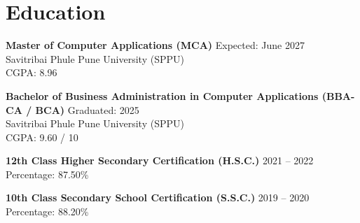 \documentclass[a4paper,10pt]{article}
\begin{document}
\section*{Education}

\textbf{Master of Computer Applications (MCA)} \hfill Expected: June 2027\\
Savitribai Phule Pune University (SPPU)\\
CGPA: 8.96 

\vspace{4pt} 

\textbf{Bachelor of Business Administration in Computer Applications (BBA-CA / BCA)} \hfill Graduated: 2025\\
Savitribai Phule Pune University (SPPU)\\
CGPA: 9.60 / 10

\vspace{4pt} 

\textbf{12th Class Higher Secondary Certification (H.S.C.)} \hfill 2021 -- 2022\\
Percentage: 87.50\%

\vspace{4pt} 

\textbf{10th Class Secondary School Certification (S.S.C.)} \hfill 2019 -- 2020\\
Percentage: 88.20\%
\end{document}
